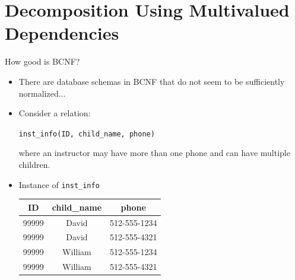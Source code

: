 \documentclass[aspectratio=169]{beamer}
\begin{document}

\section{Decomposition Using Multivalued Dependencies}

\begin{frame}{How good is BCNF?}
    \begin{itemize}
        \item There are database schemas in BCNF that do not seem to be sufficiently normalized...
        \item Consider a relation:
            \begin{center}
                \texttt{inst\_info(ID, child\_name, phone)}
            \end{center}
        where an instructor may have more than one phone and can have multiple children.
        \item Instance of \texttt{inst\_info}
            \begin{center}
                \begin{tabular}{ c c c}
                    \hline
                    \textbf{ID} & \textbf{child\_name} & \textbf{phone} \\
                    \hline
                    99999 & David   & 512-555-1234 \\
                    99999 & David   & 512-555-4321 \\
                    99999 & William & 512-555-1234 \\
                    99999 & William & 512-555-4321 \\
                    \hline
                \end{tabular}
            \end{center}
    \end{itemize}
\end{frame}
\end{document}
